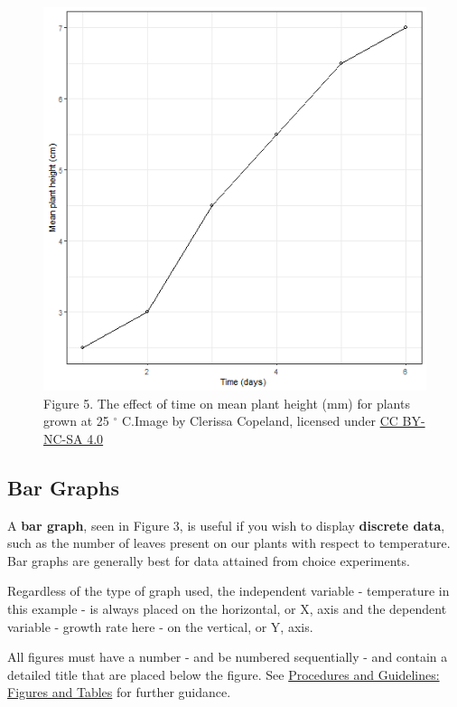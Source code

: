 \documentclass[
]{book}
\begin{document}
\begin{figure}
\centering
\includegraphics{figures_images/Lab2b-Fig2.png}
\caption{Figure 5. The effect of time on mean plant height (mm) for plants grown at 25 \(^\circ\) C.Image by Clerissa Copeland, licensed under \href{https://creativecommons.org/licenses/by-nc-sa/4.0/}{CC BY-NC-SA 4.0}}
\end{figure}

\hypertarget{bar-graphs}{%
\subsection*{Bar Graphs}\label{bar-graphs}}

A \textbf{bar graph}, seen in Figure 3, is useful if you wish to display \textbf{discrete data}, such as the number of leaves present on our plants with respect to temperature. Bar graphs are generally best for data attained from choice experiments.

Regardless of the type of graph used, the independent variable - temperature in this example - is always placed on the horizontal, or X, axis and the dependent variable - growth rate here - on the vertical, or Y, axis.

All figures must have a number - and be numbered sequentially - and contain a detailed title that are placed below the figure. See \href{https://ubco-biology.github.io/Procedures-and-Guidelines/figures-tables.html}{Procedures and Guidelines: Figures and Tables} for further guidance.
\end{document}
